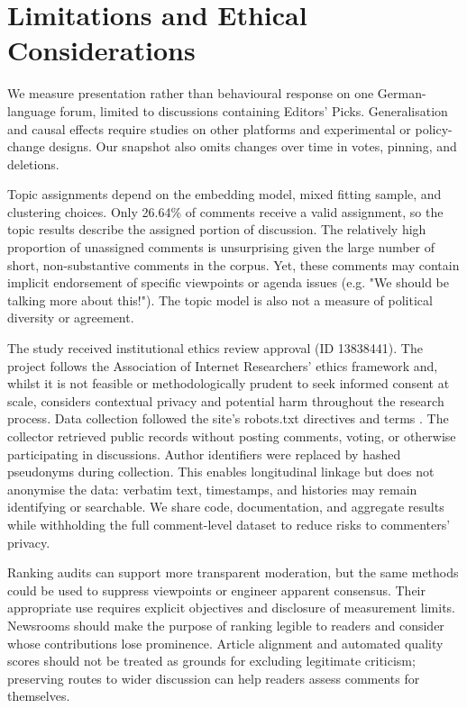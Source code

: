 \section{Limitations and Ethical Considerations}
\label{sec:ethics}

We measure presentation rather than behavioural response on one German-language forum, limited to discussions containing Editors' Picks. Generalisation and causal effects require studies on other platforms and experimental or policy-change designs. Our snapshot also omits changes over time in votes, pinning, and deletions.

Topic assignments depend on the embedding model, mixed fitting sample, and clustering choices. Only 26.64\% of comments receive a valid assignment, so the topic results describe the assigned portion of discussion. The relatively high proportion of unassigned comments is unsurprising given the large number of short, non-substantive comments in the corpus. Yet, these comments may contain implicit endorsement of specific viewpoints or agenda issues (e.g. "We should be talking more about this!"). The topic model is also not a measure of political diversity or agreement.

The study received institutional ethics review approval (ID 13838441). The project follows the Association of Internet Researchers' ethics framework \citep{AoIR2019} and, whilst it is not feasible or methodologically prudent to seek informed consent at scale, considers contextual privacy and potential harm throughout the research process. Data collection followed the site's robots.txt directives and terms \citep{DerStandard2024, DerStandardRobots2026}. The collector retrieved public records without posting comments, voting, or otherwise participating in discussions. Author identifiers were replaced by hashed pseudonyms during collection. This enables longitudinal linkage but does not anonymise the data: verbatim text, timestamps, and histories may remain identifying or searchable. We share code, documentation, and aggregate results while withholding the full comment-level dataset to reduce risks to commenters' privacy.

Ranking audits can support more transparent moderation, but the same methods could be used to suppress viewpoints or engineer apparent consensus. Their appropriate use requires explicit objectives and disclosure of measurement limits. Newsrooms should make the purpose of ranking legible to readers and consider whose contributions lose prominence. Article alignment and automated quality scores should not be treated as grounds for excluding legitimate criticism; preserving routes to wider discussion can help readers assess comments for themselves.

